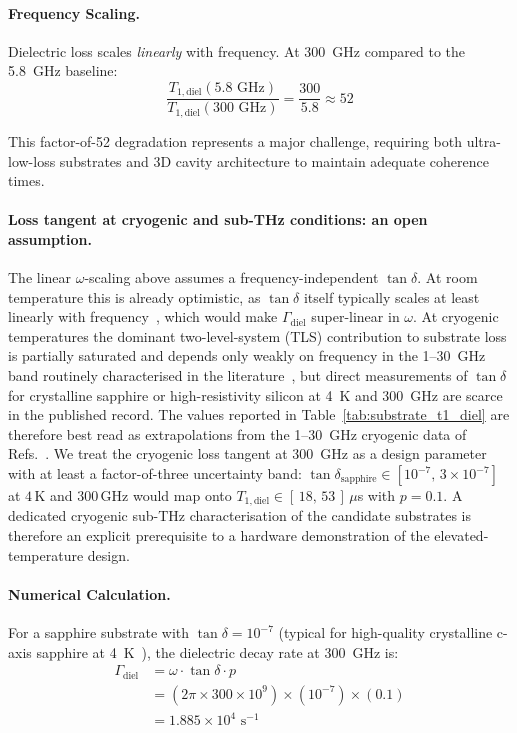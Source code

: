 \paragraph{Frequency Scaling.} 
Dielectric loss scales \textit{linearly} with frequency. At 300~GHz compared to the 5.8~GHz baseline:
\begin{equation}
\frac{T_{1,\text{diel}}(5.8 \text{ GHz})}{T_{1,\text{diel}}(300 \text{ GHz})} = \frac{300}{5.8} \approx 52
\end{equation}

This factor-of-52 degradation represents a major challenge, requiring both ultra-low-loss substrates and 3D cavity architecture to maintain adequate coherence times.

\paragraph{Loss tangent at cryogenic and sub-THz conditions: an open assumption.}
The linear $\omega$-scaling above assumes a frequency-independent $\tan\delta$.
At room temperature this is already optimistic, as $\tan\delta$ itself
typically scales at least linearly with frequency~\cite{Martinis2005TLS},
which would make $\Gamma_{\text{diel}}$ super-linear in $\omega$.
At cryogenic temperatures the dominant two-level-system (TLS) contribution
to substrate loss is partially saturated and depends only weakly on frequency
in the 1--30~GHz band routinely characterised in the literature~\cite{Muller2019TLS},
but direct measurements of $\tan\delta$ for crystalline sapphire or
high-resistivity silicon at 4~K and 300~GHz are scarce in the published record.
The values reported in Table~\ref{tab:substrate_t1_diel} are therefore best
read as extrapolations from the 1--30~GHz cryogenic data of
Refs.~\cite{Krupka1999Sapphire,Krupka2006Silicon,Janezic2014Silicon,Read2023Sapphire}.
We treat the cryogenic loss tangent at 300~GHz as a design parameter with
at least a factor-of-three uncertainty band: $\tan\delta_{\text{sapphire}}
\in [10^{-7},\,3\times 10^{-7}]$ at $4\,\text{K}$ and $300\,\text{GHz}$
would map onto $T_{1,\text{diel}}\in[\,18,\,53\,]\,\mu$s with $p=0.1$.
A dedicated cryogenic sub-THz characterisation of the candidate substrates
is therefore an explicit prerequisite to a hardware demonstration of the elevated-temperature design.

\paragraph{Numerical Calculation.}
For a sapphire substrate with $\tan\delta = 10^{-7}$ (typical for high-quality crystalline c-axis sapphire at 4~K~\cite{place2021,Romanenko2020}), the dielectric decay rate at 300~GHz is:
\begin{align}
\Gamma_{\text{diel}} &= \omega \cdot \tan\delta \cdot p \nonumber \\
                     &= (2\pi \times 300 \times 10^9) \times (10^{-7}) \times (0.1) \nonumber \\
                     &= 1.885 \times 10^{4} \text{ s}^{-1}
\end{align}

